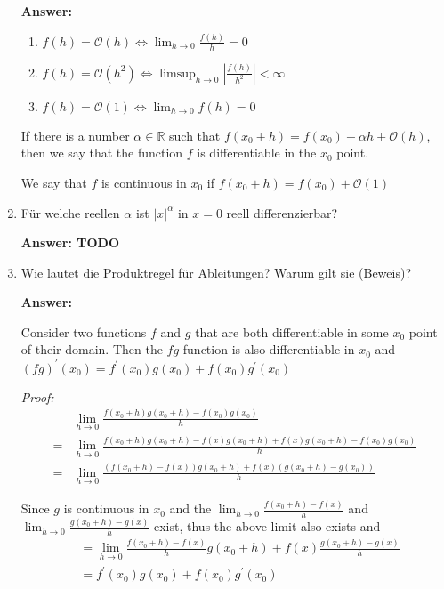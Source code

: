 \documentclass[11pt]{article}
\newcommand{\abs}[1]{\left|#1\right|}
\newcommand{\RR}[0]{\mathbb{R}}
\newcommand{\smallo}[0]{{\scriptstyle \mathcal{O}}}
\begin{document}
\begin{enumerate}
    \textbf{Answer:}
    \begin{enumerate}
        \item $f(h) = \smallo(h) \Leftrightarrow \lim_{h\to0}\frac{f(h)}{h} = 0$
        \item $f(h) = \mathcal{O}(h^2) \Leftrightarrow \limsup_{h\to0}\abs{\frac{f(h)}{h^2}} < \infty$
        \item $f(h) = \smallo(1) \Leftrightarrow \lim_{h\to0} f(h) = 0$
    \end{enumerate}

    If there is a number $\alpha \in \RR$ such that $f(x_0+h) = f(x_0) + \alpha h + \smallo(h)$, then we say that the function $f$ is differentiable in the $x_0$ point.

    We say that $f$ is continuous in $x_0$ if $f(x_0 + h) = f(x_0) + \smallo(1)$

    \item Für welche reellen $\alpha$ ist $\abs{x}^\alpha$ in $x = 0$ reell differenzierbar?
    
    \textbf{Answer: TODO}

    \item Wie lautet die Produktregel für Ableitungen? Warum gilt sie (Beweis)?
    
    \textbf{Answer:}

    Consider two functions $f$ and $g$ that are both differentiable in some $x_0$ point of their domain. Then the $f g$ function is also differentiable in $x_0$ and $(f g)^\prime(x_0) = f^\prime(x_0) g(x_0) + f(x_0) g^\prime(x_0)$
    
    \textit{Proof:}
    $$\begin{aligned}
        &\lim_{h\to0}\frac{f(x_0 + h)g(x_0 + h) - f(x_0)g(x_0)}{h} \\
        =&\lim_{h\to0}\frac{f(x_0 + h)g(x_0 + h) - f(x)g(x_0 + h) + f(x)g(x_0 + h)- f(x_0)g(x_0)}{h}\\
        =&\lim_{h\to0}\frac{(f(x_0 + h)- f(x))g(x_0 + h) + f(x)(g(x_0 + h)- g(x_0))}{h}
    \end{aligned}$$

    Since $g$ is continuous in $x_0$ and the $\lim_{h\to0}\frac{f(x_0 + h)- f(x)}{h}$ and $\lim_{h\to0}\frac{g(x_0 + h)- g(x)}{h}$ exist, thus the above limit also exists and 
    $$\begin{aligned}&= \lim_{h\to0}\frac{f(x_0 + h)- f(x)}{h} g(x_0 + h) + f(x)\frac{g(x_0 + h)- g(x)}{h} \\&=f^\prime(x_0) g(x_0) + f(x_0) g^\prime(x_0)\end{aligned}$$


\end{enumerate}
\end{document}
